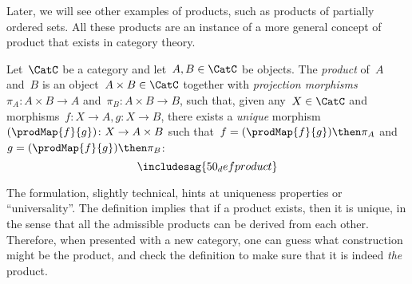 Later, we will see other examples of products, such as products of partially ordered sets.
All these products are an instance of a more general concept of product that exists in category
theory.
 
\begin{shaded}
\begin{definition}
Let~$\CatC$ be a category and let~$A,B\in \CatC$ be objects. The \emph{product} of~$A$ and~$B$ is an object~$A \times B \in \CatC$ together with \emph{projection morphisms}~$\pi_A \colon A \times B \to A$ and~$\pi_B \colon A \times B \to B$, such that, given any~$X \in \CatC$ and morphisms~$f \colon X \to A, g \colon X \to B$, there exists a \emph{unique} morphism~$(\prodMap{f}{g}) \colon X \to A \times B$ such that~$f = (\prodMap{f}{g})\then \pi_A$ and~$g=(\prodMap{f}{g})\then \pi_B$:
\begin{equation}
\includesag{50_defproduct}
\end{equation}
\end{definition}
\end{shaded}

The formulation, slightly technical, hints at uniqueness properties or ``universality''. The definition implies that if a product exists, then it is unique, in the sense that all the admissible products can be derived from each other. Therefore, when presented with a new category, one can guess what construction might be the product, and check the definition to make sure that it is indeed \emph{the} product.

